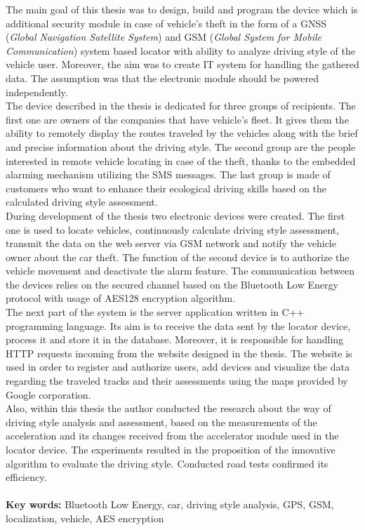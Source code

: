 \begin{singlespacing}


The main goal of this thesis was to design, build and program the device which is additional security module in case of vehicle's theft in the form of a GNSS (\textit{Global Navigation Satellite System}) and GSM (\textit{Global System for Mobile Communication}) system based locator with ability to analyze driving style of the vehicle user. Moreover, the aim was to create IT system for handling the gathered data. The assumption was that the electronic module should be powered independently. \\

The device described in the thesis is dedicated for three groups of recipients. The first one are owners of the companies that have vehicle's fleet. It gives them the ability to remotely display the routes traveled by the vehicles along with the brief and precise information about the driving style. The second group are the people interested in remote vehicle locating in case of the theft, thanks to the embedded alarming mechanism utilizing the SMS messages. The last group is made of customers who want to enhance their ecological driving skills based on the calculated driving style assessment. \\

During development of the thesis two electronic devices were created. The first one is used to locate vehicles,  continuously calculate driving style assessment, transmit the data on the web server via GSM network and notify the vehicle owner about the car theft. The function of the second device is to authorize the vehicle movement and deactivate the alarm feature. The communication between the devices relies on the secured channel based on the Bluetooth Low Energy protocol with usage of AES128 encryption algorithm. \\

The next part of the system is the server application written in C++ programming language. Its aim is to receive the data sent by the locator device, process it and store it in the database. Moreover, it is responsible for handling HTTP requests incoming from the website designed in the thesis. The website is used in order to register and authorize users, add devices and visualize the data regarding the traveled tracks and their assessments using the maps provided by Google corporation. \\

Also, within this thesis the author conducted the research about the way of driving style analysis and assessment, based on the measurements of the acceleration and its changes received from the accelerator module used in the locator device. The experiments resulted in the proposition of the innovative algorithm to evaluate the driving style. Conducted road tests confirmed its efficiency. \\

\flushbottom
\textbf{\\Key words: }Bluetooth Low Energy, car, driving style analysis, GPS, GSM, localization, vehicle, AES encryption
\end{singlespacing}
